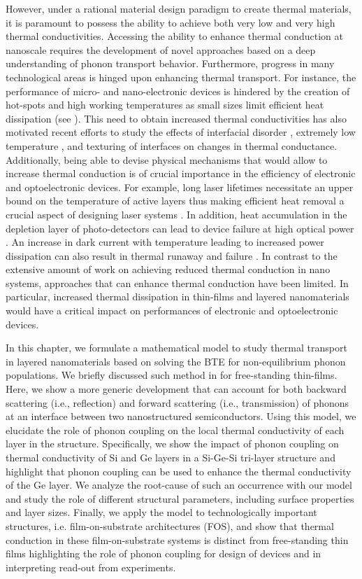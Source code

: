 \par However, under a rational material design paradigm to create thermal materials, it is paramount to possess the ability to achieve both very low and very high thermal conductivities. Accessing the ability to enhance thermal conduction at nanoscale requires the development of novel approaches based on a deep understanding of phonon transport behavior. Furthermore, progress in many technological areas is hinged upon enhancing thermal transport. For instance, the performance of micro- and nano-electronic devices is hindered by the creation of hot-spots and high working temperatures as small sizes limit efficient heat dissipation (see ). This need to obtain increased thermal conductivities has also motivated recent efforts to study the effects of interfacial disorder \cite{RN265}, extremely low temperature \cite{RN397}, and texturing of interfaces \cite{RN398} on changes in thermal conductance. Additionally, being able to devise physical mechanisms that would allow to increase thermal conduction is of crucial importance in the efficiency of electronic and optoelectronic devices. For example, long laser lifetimes necessitate an upper bound on the temperature of active layers thus making efficient heat removal a crucial aspect of designing laser systems \cite{ownKK1}. In addition, heat accumulation in the depletion layer of photo-detectors can lead to device failure at high optical power \cite{kk-li2003}. An increase in dark current with temperature leading to increased power dissipation can also result in thermal runaway and failure \cite{kk-Lorenzen2001}. In contrast to the extensive amount of work on achieving reduced thermal conduction in nano systems, approaches that can enhance thermal conduction have been limited. In particular, increased thermal dissipation in thin-films and layered nanomaterials would have a critical impact on performances of electronic and optoelectronic devices.
\par In this chapter, we formulate a mathematical model to study thermal transport in layered nanomaterials based on solving the BTE for non-equilibrium phonon populations. We briefly discussed such method in  for free-standing thin-films. Here, we show a more generic development that can account for both backward scattering (i.e., reflection) and forward scattering (i.e., transmission) of phonons at an interface between two nanostructured semiconductors. Using this model, we elucidate the role of phonon coupling on the local thermal conductivity of each layer in the structure. Specifically, we show the impact of phonon coupling on thermal conductivity of Si and Ge layers in a Si-Ge-Si tri-layer structure and highlight that phonon coupling can be used to enhance the thermal conductivity of the Ge layer. We analyze the root-cause of such an occurrence with our model and study the role of different structural parameters, including surface properties and layer sizes. Finally, we apply the model to technologically important structures, i.e. film-on-substrate architectures (FOS), and show that thermal conduction in these film-on-substrate systems is distinct from free-standing thin films highlighting the role of phonon coupling for design of devices and in interpreting read-out from experiments.

